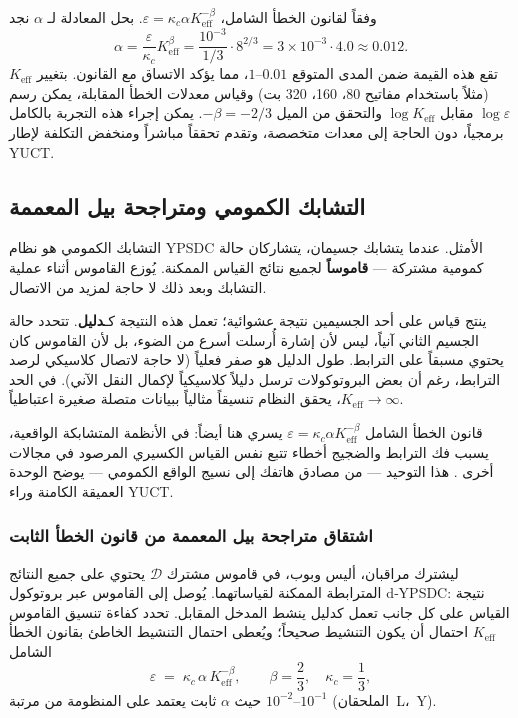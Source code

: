 \documentclass[12pt,a4paper]{article}
\newcommand{\Keff}{K_{\mathrm{eff}}}
\theoremstyle{remark}
\begin{document}
	وفقاً لقانون الخطأ الشامل، \(\varepsilon = \kappa_c \alpha K_{\mathrm{eff}}^{-\beta}\). بحل المعادلة لـ \(\alpha\) نجد
	\[
	\alpha = \frac{\varepsilon}{\kappa_c} K_{\mathrm{eff}}^{\beta} = \frac{10^{-3}}{1/3} \cdot 8^{2/3} = 3 \times 10^{-3} \cdot 4.0 \approx 0.012.
	\]
	تقع هذه القيمة ضمن المدى المتوقع \(0.01\)–\(1\)، مما يؤكد الاتساق مع القانون. بتغيير \(\Keff\) (مثلاً باستخدام مفاتيح 80، 160، 320 بت) وقياس معدلات الخطأ المقابلة، يمكن رسم \(\log \varepsilon\) مقابل \(\log \Keff\) والتحقق من الميل \(-\beta = -2/3\). يمكن إجراء هذه التجربة بالكامل برمجياً، دون الحاجة إلى معدات متخصصة، وتقدم تحققاً مباشراً ومنخفض التكلفة لإطار YUCT.
	
	\subsection{التشابك الكمومي ومتراجحة بيل المعممة}
	
	التشابك الكمومي هو نظام YPSDC الأمثل. عندما يتشابك جسيمان، يتشاركان حالة كمومية مشتركة — \textbf{قاموساً} لجميع نتائج القياس الممكنة. يُوزع القاموس أثناء عملية التشابك وبعد ذلك لا حاجة لمزيد من الاتصال.
	
	ينتج قياس على أحد الجسيمين نتيجة عشوائية؛ تعمل هذه النتيجة كـ\textbf{دليل}. تتحدد حالة الجسيم الثاني آنياً، ليس لأن إشارة أُرسلت أسرع من الضوء، بل لأن القاموس كان يحتوي مسبقاً على الترابط. طول الدليل هو صفر فعلياً (لا حاجة لاتصال كلاسيكي لرصد الترابط، رغم أن بعض البروتوكولات ترسل دليلاً كلاسيكياً لإكمال النقل الآني). في الحد \(\Keff \to \infty\)، يحقق النظام تنسيقاً مثالياً ببيانات متصلة صغيرة اعتباطياً.
	
	قانون الخطأ الشامل \(\varepsilon = \kappa_c \alpha K_{\mathrm{eff}}^{-\beta}\) يسري هنا أيضاً: في الأنظمة المتشابكة الواقعية، يسبب فك الترابط والضجيج أخطاء تتبع نفس القياس الكسيري المرصود في مجالات أخرى \cite{AppendixG, AppendixS}. هذا التوحيد — من مصادق هاتفك إلى نسيج الواقع الكمومي — يوضح الوحدة العميقة الكامنة وراء YUCT.
	
	\subsubsection{اشتقاق متراجحة بيل المعممة من قانون الخطأ الثابت}
	\label{subsec:bell-derivation}
	
	ليشترك مراقبان، أليس وبوب، في قاموس مشترك \(\mathcal{D}\) يحتوي على جميع النتائج المترابطة الممكنة لقياساتهما. يُوصل إلى القاموس عبر بروتوكول d‑YPSDC: نتيجة القياس على كل جانب تعمل كدليل ينشط المدخل المقابل. تحدد كفاءة تنسيق القاموس \(K_{\mathrm{eff}}\) احتمال أن يكون التنشيط صحيحاً؛ ويُعطى احتمال التنشيط الخاطئ بقانون الخطأ الشامل
	\begin{equation}
		\varepsilon \;=\; \kappa_c\,\alpha\,K_{\mathrm{eff}}^{-\beta},
		\qquad \beta = \frac{2}{3},\quad \kappa_c = \frac{1}{3},
		\label{eq:error-law-bell}
	\end{equation}
	حيث \(\alpha\) ثابت يعتمد على المنظومة من مرتبة \(10^{-2}\)–\(10^{-1}\) (الملحقان~L،~Y).
	
\end{document}

